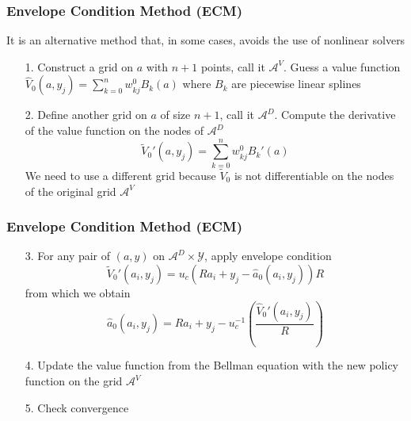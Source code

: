 \documentclass[aspectratio=169, 11pt]{beamer}
\begin{document}
\begin{frame}
\frametitle{Envelope Condition Method (ECM)}
It is an alternative method that, in some cases, avoids the use of nonlinear solvers
  \begin{itemize}
    \bigskip
    \item[1.] Construct a grid on $a$ with $n+1$ points, call it $\mathcal{A}^{V}$. Guess a value function $\hat{V}_{0}\left(a,y_{j}\right)=\sum_{k=0}^{n}w_{kj}^{0}B_{k}\left(a\right)$ where $B_{k}$ are piecewise linear splines
    \bigskip
    \item[2.] Define another grid on $a$ of size $n+1$, call it $\mathcal{A}^{D}$. Compute the derivative of the value function on the nodes of $\mathcal{A}^{D}$
    \[
      \tilde{V}_{0}'\left(a,y_{j}\right)=\sum_{k=0}^{n}w_{kj}^{0}B_{k}'\left(a\right)
    \]
    We need to use a different grid because $\tilde{V}_{0}$ is not differentiable on the nodes of the original grid $\mathcal{A}^{V}$
  \end{itemize}
\end{frame}

\begin{frame}
\frametitle{Envelope Condition Method (ECM)}
  \begin{itemize}
    \item[3.] For any pair of $\left(a,y\right)$ on $\mathcal{A}^{D}\times\mathcal{Y}$, apply envelope condition
    \[
      \tilde{V}_{0}'\left(a_{i},y_{j}\right)=u_{c}\left(Ra_{i}+y_{j}-\hat{a}_{0}\left(a_{i},y_{j}\right)\right)R
    \]
    from which we obtain
    \[
      \hat{a}_{0}\left(a_{i},y_{j}\right)=Ra_{i}+y_{j}-u_{c}^{-1}\left(\frac{\hat{V}_{0}'\left(a_{i},y_{j}\right)}{R}\right)
    \]
    \bigskip
    \item[4.] Update the value function from the Bellman equation with the new policy function on the grid $\mathcal{A}^{V}$
    \bigskip
    \item[5.] Check convergence
  \end{itemize}
\end{frame}
\end{document}
